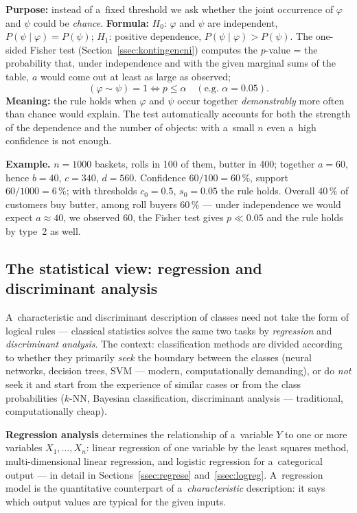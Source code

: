 \documentclass[11pt,a4paper]{article}
\theoremstyle{definition}
\begin{document}
\begin{defbox}
\textbf{Purpose:} instead of a~fixed threshold we ask whether the joint occurrence of
$\varphi$ and $\psi$ could be \emph{chance}. \textbf{Formula:} $H_0$: $\varphi$ and
$\psi$ are independent, $P(\psi\mid\varphi)=P(\psi)$; $H_1$: positive dependence,
$P(\psi\mid\varphi)>P(\psi)$. The one-sided Fisher test
(Section~\ref{ssec:kontingencni}) computes the $p$-value = the probability that, under
independence and with the given marginal sums of the table, $a$ would come out at least
as large as observed;
\[ (\varphi\sim\psi)=1 \iff p\le\alpha \quad(\text{e.g.\ } \alpha=0.05). \]
\textbf{Meaning:} the rule holds when $\varphi$ and $\psi$ occur together
\emph{demonstrably} more often than chance would explain. The test automatically
accounts for both the strength of the dependence and the number of objects: with
a~small $n$ even a~high confidence is not enough.
\end{defbox}

\textbf{Example.} $n=1000$ baskets, rolls in 100 of them, butter in 400; together
$a=60$, hence $b=40$, $c=340$, $d=560$. Confidence $60/100=60\,\%$, support
$60/1000=6\,\%$; with thresholds $c_0=0.5$, $s_0=0.05$ the rule holds. Overall $40\,\%$
of customers buy butter, among roll buyers $60\,\%$ --- under independence we would
expect $a\approx40$, we observed 60, the Fisher test gives $p\ll0.05$ and the rule holds
by type~2 as well.

\subsection{The statistical view: regression and discriminant analysis}
\label{ssec:stat-pohled}

A~characteristic and discriminant description of classes need not take the form of
logical rules --- classical statistics solves the same two tasks by \emph{regression}
and \emph{discriminant analysis}. The context: classification methods are divided
according to whether they primarily \emph{seek} the boundary between the classes
(neural networks, decision trees, SVM --- modern, computationally demanding), or do
\emph{not} seek it and start from the experience of similar cases or from the class
probabilities ($k$-NN, Bayesian classification, discriminant analysis --- traditional,
computationally cheap).

\textbf{Regression analysis} determines the relationship of a~variable $Y$ to one or
more variables $X_1,\dots,X_n$: linear regression of one variable by the least squares
method, multi-dimensional linear regression, and logistic regression for
a~categorical output --- in detail in Sections~\ref{ssec:regrese}
and~\ref{ssec:logreg}. A~regression model is the quantitative counterpart of
a~\emph{characteristic} description: it says which output values are typical for the
given inputs.
\end{document}
